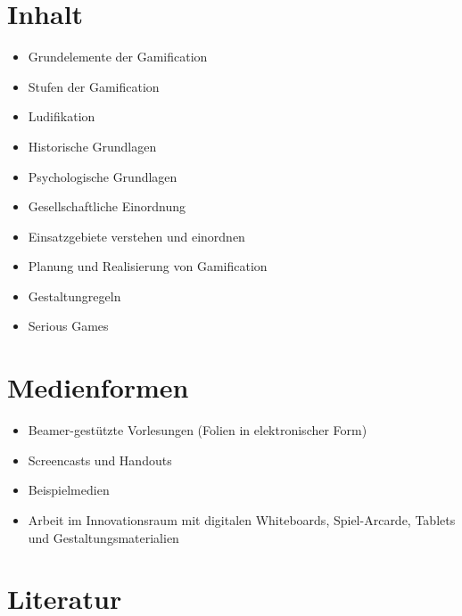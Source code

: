 \hypertarget{inhaltpathlabelmi-2017modulbeschreibungen-bachelorba_sc_gamification}{%
\section*{Inhalt\label{/mi-2017/modulbeschreibungen-bachelor/BA_SC_gamification}}\label{inhaltpathlabelmi-2017modulbeschreibungen-bachelorba_sc_gamification}}

\begin{itemize}
\tightlist
\item
  Grundelemente der Gamification
\item
  Stufen der Gamification
\item
  Ludifikation
\item
  Historische Grundlagen
\item
  Psychologische Grundlagen
\item
  Gesellschaftliche Einordnung
\item
  Einsatzgebiete verstehen und einordnen
\item
  Planung und Realisierung von Gamification
\item
  Gestaltungregeln
\item
  Serious Games
\end{itemize}

\hypertarget{medienformenpathlabelmi-2017modulbeschreibungen-bachelorba_sc_gamification}{%
\section*{Medienformen\label{/mi-2017/modulbeschreibungen-bachelor/BA_SC_gamification}}\label{medienformenpathlabelmi-2017modulbeschreibungen-bachelorba_sc_gamification}}

\begin{itemize}
\tightlist
\item
  Beamer-gestützte Vorlesungen (Folien in elektronischer Form)
\item
  Screencasts und Handouts
\item
  Beispielmedien
\item
  Arbeit im Innovationsraum mit digitalen Whiteboards, Spiel-Arcarde,
  Tablets und Gestaltungsmaterialien
\end{itemize}

\hypertarget{literaturpathlabelmi-2017modulbeschreibungen-bachelorba_sc_gamification}{%
\section*{Literatur\label{/mi-2017/modulbeschreibungen-bachelor/BA_SC_gamification}}\label{literaturpathlabelmi-2017modulbeschreibungen-bachelorba_sc_gamification}}

